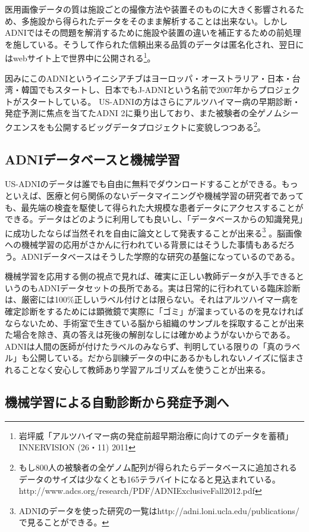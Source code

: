 医用画像データの質は施設ごとの撮像方法や装置そのものに大きく影響されるため、多施設から得られたデータをそのまま解析することは出来ない。しかしADNIではその問題を解消するために施設や装置の違いを補正するための前処理を施している。そうして作られた信頼出来る品質のデータは匿名化され、翌日にはwebサイト上で世界中に公開される\footnote{岩坪威「アルツハイマー病の発症前超早期治療に向けてのデータを蓄積」INNERVISION (26・11) 2011}。

因みにこのADNIというイニシアチブはヨーロッパ・オーストラリア・日本・台湾・韓国でもスタートし、日本でもJ-ADNIという名前で2007年からプロジェクトがスタートしている。
US-ADNIの方はさらにアルツハイマー病の早期診断・発症予測に焦点を当てたADNI 2に乗り出しており、また被験者の全ゲノムシークエンスをも公開するビッグデータプロジェクトに変貌しつつある\footnote{もし800人の被験者の全ゲノム配列が得られたらデータベースに追加されるデータのサイズは少なくとも165テラバイトになると見込まれている。http://www.adcs.org/research/PDF/ADNIExclusiveFall2012.pdf}。

\subsection{ADNIデータベースと機械学習}
US-ADNIのデータは誰でも自由に無料でダウンロードすることができる。もっといえば、医療と何ら関係のないデータマイニングや機械学習の研究者であっても、最先端の検査を駆使して得られた大規模な患者データにアクセスすることができる。データはどのように利用しても良いし、「データベースからの知識発見」に成功したならば当然それを自由に論文として発表することが出来る\footnote{ADNIのデータを使った研究の一覧はhttp://adni.loni.ucla.edu/publications/で見ることができる。}
。脳画像への機械学習の応用がさかんに行われている背景にはそうした事情もあるだろう。ADNIデータベースはそうした学際的な研究の基盤になっているのである。

機械学習を応用する側の視点で見れば、確実に正しい教師データが入手できるというのもADNIデータセットの長所である。実は日常的に行われている臨床診断は、厳密には100\%正しいラベル付けとは限らない。それはアルツハイマー病を確定診断をするためには顕微鏡で実際に「ゴミ」が溜まっているのを見なければならないため、手術室で生きている脳から組織のサンプルを採取することが出来た場合を除き、真の答えは死後の解剖なしには確かめようがないからである。ADNIは人間の医師が付けたラベルのみならず、判明している限りの「真のラベル」も公開している。だから訓練データの中にあるかもしれないノイズに悩まされることなく安心して教師あり学習アルゴリズムを使うことが出来る。
\subsection{機械学習による自動診断から発症予測へ}

